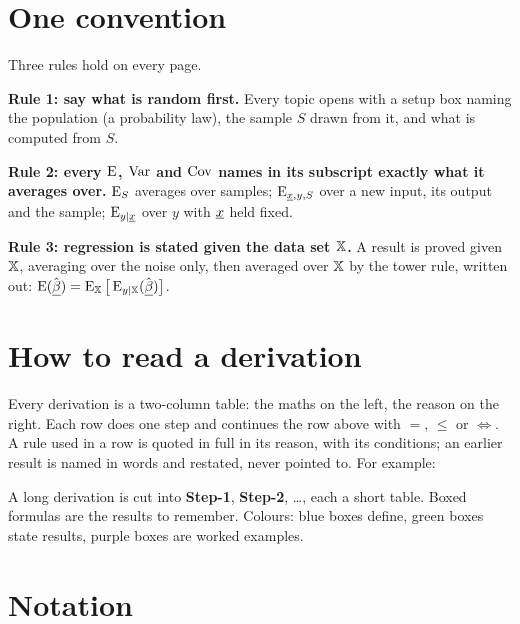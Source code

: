 \section*{One convention}

Three rules hold on every page.

\textbf{Rule 1: say what is random first.} Every topic opens with a setup box naming the population (a probability law), the sample $S$ drawn from it, and what is computed from $S$.

\textbf{Rule 2: every $\operatorname{E}$, $\operatorname{Var}$ and $\operatorname{Cov}$ names in its subscript exactly what it averages over.} $\operatorname{E}_S$ averages over samples; $\operatorname{E}_{\underline{x},y,S}$ over a new input, its output and the sample; $\operatorname{E}_{y\mid\underline{x}}$ over $y$ with $\underline{x}$ held fixed.

\textbf{Rule 3: regression is stated given the data set $\mathbb{X}$.} A result is proved given $\mathbb{X}$, averaging over the noise only, then averaged over $\mathbb{X}$ by the tower rule, written out: $\operatorname{E}(\hat{\underline{\beta}})=\operatorname{E}_{\mathbb{X}}\big[\operatorname{E}_{y\mid\mathbb{X}}(\hat{\underline{\beta}})\big]$.

\section*{How to read a derivation}

Every derivation is a two-column table: the maths on the left, the reason on the right. Each row does one step and continues the row above with $=$, $\le$ or $\iff$. A rule used in a row is quoted in full in its reason, with its conditions; an earlier result is named in words and restated, never pointed to. For example:

\begin{deriv}
\end{deriv}

A long derivation is cut into \textbf{Step-1}, \textbf{Step-2}, \ldots, each a short table. Boxed formulas are the results to remember. Colours: blue boxes define, green boxes state results, purple boxes are worked examples.

\section*{Notation}

